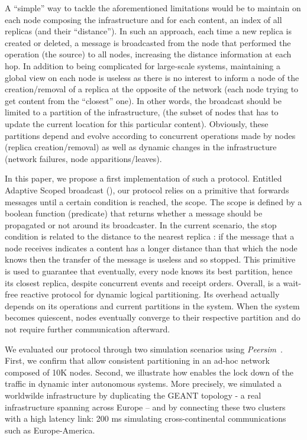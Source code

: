 A ``simple'' way to tackle the aforementioned limitations would be to
maintain on each node composing the infrastructure and for each
content, an index of all replicas (and their ``distance'').  In such
an approach, each time a new replica is created or deleted, a message
is broadcasted from the node that performed the operation (\ie the
source) to all nodes, increasing the distance information at each hop.
%
In addition to being complicated for large-scale systems, maintaining
a global view on each node is useless as there is no interest to
inform a node of the creation/removal of a replica at the opposite of
the network (each node trying to get content from the ``closest''
one).  In other words, the broadcast should be limited to a partition
of the infrastructure, (\ie the subset of nodes that has to update the
current location for this particular content). Obviously, these
partitions depend and evolve according to concurrent operations made
by nodes (replica creation/removal) as well as dynamic changes in the
infrastructure (network failures, node apparitions/leaves).

In this paper, we propose a first implementation of such a protocol.
Entitled Adaptive Scoped broadcast (\NAME), 
our protocol relies on a primitive that forwards
messages until a certain condition is reached, \ie the scope. The
scope is defined by a boolean function (predicate) that returns
whether a message should be propagated or not around its
broadcaster. In the current scenario, the stop condition is related to
the distance to the nearest replica : if the message that a node receives
indicates a content has a longer distance than that which the node
knows then the transfer of the message is useless and so stopped.
%
This primitive is used to guarantee that eventually, every node knows
its best partition, hence its closest replica, despite concurrent
events and receipt orders. Overall, \NAME is a wait-free reactive protocol for
dynamic logical partitioning.  Its overhead actually depends on
its operations and current partitions in the system. When the system
becomes quiescent, nodes eventually converge to their respective
partition and do not require further communication afterward.


We evaluated our protocol through two simulation scenarios using
\textit{Peersim}~\cite{montresor2009peersim}. First, we confirm that
\NAME allow consistent partitioning in an ad-hoc network composed of
10K nodes.  Second, we illustrate how \NAME enables the lock down of
the traffic in dynamic inter autonomous systems.  More precisely, we
simulated a worldwilde infrastructure by duplicating the GEANT
topology - a real infrastructure spanning across Europe – and by
connecting these two clusters with a high latency link: 200 ms
simulating cross-continental communications such as Europe-America.

